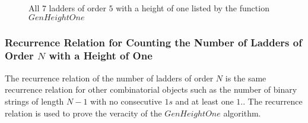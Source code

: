 \begin{figure}[!htp]
\begin{center}
        \end{center}
        \caption{All $7$ ladders of order $5$ with a height of one listed by the function $GenHeightOne$}
        \label{Fig:GenHeightOne}
   \end{figure}

   \subsubsection{Recurrence Relation for Counting the Number of Ladders of Order $N$ with a Height of One}
   The recurrence relation of the number of ladders of order $N$ is the same recurrence relation for 
   other combinatorial objects such as the number of binary strings of length $N-1$ with no consecutive $1s$ 
   and at least one $1$.\cite{A8}\cite{A11}. The recurrence relation is used to prove the veracity of the $GenHeightOne$ algorithm.\par 
   
